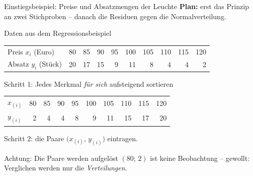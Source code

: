 \documentclass[aspectratio=169,11pt]{beamer}
\begin{document}
\begin{frame}{Einstiegsbeispiel: Preise und Absatzmengen der Leuchte}
  \small
  {\color{hsbibluedark}\textbf{Plan:} erst das Prinzip an zwei Stichproben -- danach die
  Residuen gegen die Normalverteilung.}\par\smallskip
  \begin{block}{Daten aus dem Regressionsbeispiel}
    \begin{center}
      \begin{tabular}{l*{9}{r}}
        \toprule
        Preis $x_i$ (Euro)  & 80 & 85 & 90 & 95 & 100 & 105 & 110 & 115 & 120 \\
        Absatz $y_i$ (Stück) & 20 & 17 & 15 & 9  & 11  & 8   & 4   & 4   & 2   \\
        \bottomrule
      \end{tabular}
    \end{center}
  \end{block}

  \begin{block}{Schritt 1: Jedes Merkmal \emph{für sich} aufsteigend sortieren}
    \begin{center}
      \begin{tabular}{l*{9}{r}}
        \toprule
        $x_{(i)}$ & 80 & 85 & 90 & 95 & 100 & 105 & 110 & 115 & 120 \\
        $y_{(i)}$ & 2  & 4  & 4  & 8  & 9   & 11  & 15  & 17  & 20  \\
        \bottomrule
      \end{tabular}
    \end{center}
    Schritt 2: die Paare $\bigl(x_{(i)},\, y_{(i)}\bigr)$ eintragen.
  \end{block}

  \begin{alertblock}{Achtung: Die Paare werden aufgelöst}
    $(80;\,2)$ ist keine Beobachtung -- gewollt: Verglichen werden nur die \emph{Verteilungen}.
  \end{alertblock}
\end{frame}
\end{document}
